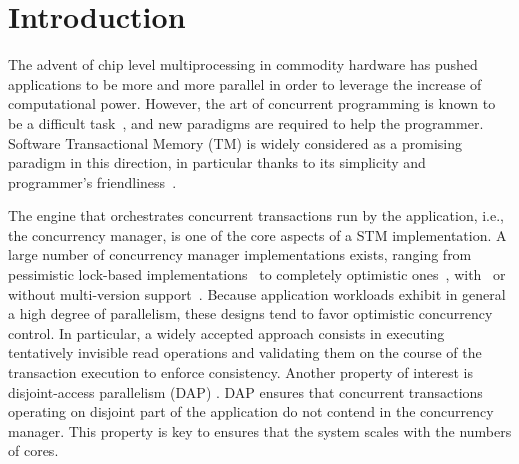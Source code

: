 \section{Introduction}

The advent of chip level multiprocessing in commodity hardware has pushed applications to be more and more parallel in order to leverage the increase of computational power.
However, the art of concurrent programming is known to be a difficult task~\cite{Lee:2006:PT:1137232.1137289}, and new paradigms are required to help the programmer.
Software Transactional Memory (TM) is widely considered as a promising paradigm in this direction, in particular thanks to its simplicity and programmer's friendliness~\cite{Dragojevic:2011:WSM:1924421.1924440}.

The engine that orchestrates concurrent transactions run by the application, i.e., the concurrency manager, is one of the core aspects of a STM implementation.
A large number of concurrency manager implementations exists, ranging from pessimistic lock-based implementations~\cite{harris2005revocable,afek2012pessimistic} to completely optimistic ones~\cite{hassan2014optimistic}, with~\cite{perelman2011smv} or without multi-version support~\cite{attiya2012single}.
Because application workloads exhibit in general a high degree of parallelism, these designs tend to favor optimistic concurrency control.
In particular, a widely accepted approach consists in executing tentatively invisible read operations and validating them on the course of the transaction execution to enforce consistency.
Another property of interest is disjoint-access parallelism (DAP) \cite{}.
DAP ensures that concurrent transactions operating on disjoint part of the application do not contend in the concurrency manager.
This property is key to ensures that the system scales with the numbers of cores.

